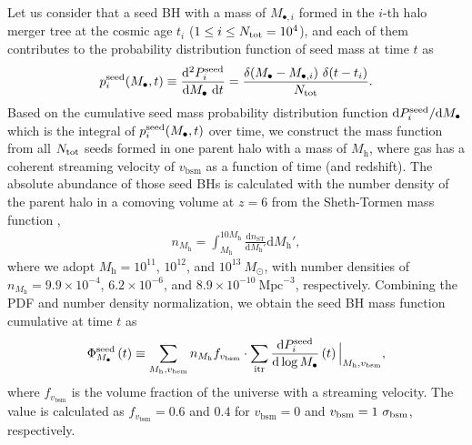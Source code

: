 \documentclass[twocolumn, twocolappendix]{aastex63}
\newcommand{\Msun}{M_\odot}
\newcommand{\Mh}{M_\mathrm{h}}
\newcommand{\Mbh}{M_\bullet}
\newcommand{\vbsm}{v_\mathrm{bsm}}
\newcommand{\D}{\mathrm{d}}
\begin{document}
\begin{CJK*}{UTF8}{gbsn}
Let us consider that a seed BH with a mass of $M_{\bullet,i}$ formed in the $i$-th halo merger tree at the cosmic age $t_i$ ($1\leq i \leq N_{\rm tot}=10^4$),
and each of them contributes to the probability distribution function of seed mass at time $t$ as
% 
\begin{equation}
  p^{\rm seed}_i (\Mbh,t)\equiv \frac{\D^2 P^{\rm seed}_i}{\D \Mbh ~\D t}= \frac{ \delta(\Mbh-M_{\bullet,i})~ \delta(t-t_i)}{N_{\rm tot}}.
\end{equation}
%
Based on the cumulative seed mass probability distribution function $\D P^{\rm seed}_i/ \D \Mbh$ 
which is the integral of $p^{\rm seed}_i (\Mbh,t)$ over time, 
we construct the mass function from all $N_{\rm tot}$ seeds formed in one parent halo
with a mass of $\Mh$, where gas has a coherent streaming velocity of $\vbsm$ as a function of time (and redshift).
The absolute abundance of those seed BHs is calculated with the number density of the parent halo in a comoving volume at $z=6$ 
from the Sheth-Tormen mass function \citep{2001MNRAS.323....1S},
%
\begin{align}
  n_{\Mh}= \int_{\Mh}^{10\Mh}  \frac{\D n_{\mathrm{ST}}} {\D \Mh'} \D \Mh', 
\end{align}
%
where we adopt $\Mh = 10^{11}$, $10^{12}$, and $10^{13}~\Msun$, with number densities of
$n_{\Mh} = 9.9\times 10^{-4}$, $6.2\times 10^{-6}$, and $8.9\times 10^{-10}~ \text{Mpc}^{-3}$, respectively.
Combining the PDF and number density normalization, we obtain the seed BH mass function cumulative at time $t$ as
%
\begin{align}
\Phi_{\Mbh}^{\rm seed}\left(t\right) \equiv \sum_{\Mh, \vbsm} n_{\Mh} f_{\vbsm} 
\cdot \sum_{\rm itr} \frac{\D P^{\rm seed}_i}{\D \log \Mbh}\left(t\right) \Big| _{\Mh, \vbsm},
\end{align}
%
where $f_{\vbsm}$ is the volume fraction of the universe with a streaming velocity.
The value is calculated as $f_{\vbsm} = 0.6$ and $0.4$ for $\vbsm = 0$ and $\vbsm=1~\sigma_{\rm bsm}$, respectively. 





\end{CJK*}
\end{document}
